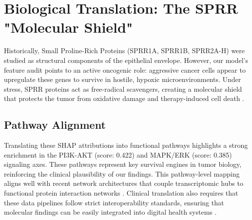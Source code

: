 \documentclass[11pt]{article}
\begin{document}
\section{Biological Translation: The SPRR "Molecular Shield"}

Historically, Small Proline-Rich Proteins (SPRR1A, SPRR1B, SPRR2A-H) were studied as structural components of the epithelial envelope. However, our model's feature audit points to an active oncogenic role: aggressive cancer cells appear to upregulate these genes to survive in hostile, hypoxic microenvironments. Under stress, SPRR proteins act as free-radical scavengers, creating a molecular shield that protects the tumor from oxidative damage and therapy-induced cell death \citep{wang2025deeppathomic, alharbi2025mogkan}.

\subsection{Pathway Alignment}
Translating these SHAP attributions into functional pathways highlights a strong enrichment in the PI3K-AKT (score: 0.422) and MAPK/ERK (score: 0.385) signaling axes. These pathways represent key survival engines in tumor biology, reinforcing the clinical plausibility of our findings. This pathway-level mapping aligns well with recent network architectures that couple transcriptomic hubs to functional protein interaction networks \citep{alharbi2024lassomogat, zheng2025graph}. Clinical translation also requires that these data pipelines follow strict interoperability standards, ensuring that molecular findings can be easily integrated into digital health systems \citep{wilkinson2016, hl7fhir, smith2026fhir, roberts2024standards}.
\end{document}
